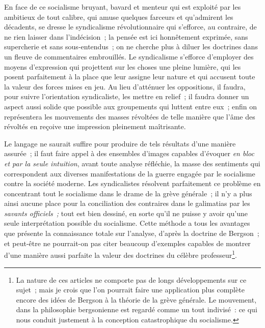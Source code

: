\documentclass[french,twoside]{book} %
\begin{document}
\noindent En face de ce socialisme bruyant, bavard et menteur qui est exploité par les ambitieux de tout calibre, qui amuse quelques farceurs et qu’admirent les décadents, se dresse le syndicalisme révolutionnaire qui s’efforce, au contraire, de ne rien laisser dans l’indécision ; la pensée est ici honnêtement exprimée, sans supercherie et sans sous-entendus ; on ne cherche plus à diluer les doctrines dans un fleuve de commentaires embrouillés. Le syndicalisme s’efforce d’employer des moyens d’expression qui projettent sur les choses une pleine lumière, qui les posent parfaitement à la place que leur assigne leur nature et qui accusent toute la valeur des forces mises en jeu. Au lieu d’atténuer les oppositions, il faudra, pour suivre l’orientation syndicaliste, les mettre en relief ; il faudra donner un aspect aussi solide que possible aux groupements qui luttent entre eux ; enfin on représentera les mouvements des masses révoltées de telle  manière que l’âme des révoltés en reçoive une impression pleinement maîtrisante.\par
Le langage ne saurait suffire pour produire de tels résultats d’une manière assurée ; il faut faire appel à des ensembles d’images capables d’évoquer \emph{en bloc et par la seule intuition}, avant toute analyse réfléchie, la masse des sentiments qui correspondent aux diverses manifestations de la guerre engagée par le socialisme contre la société moderne. Les syndicalistes résolvent parfaitement ce problème en concentrant tout le socialisme dans le drame de la grève générale ; il n’y a plus ainsi aucune place pour la conciliation des contraires dans le galimatias par les \emph{savants officiels ;} tout est bien dessiné, en sorte qu’il ne puisse y avoir qu’une seule interprétation possible du socialisme. Cette méthode a tous les avantages que présente la connaissance totale sur l’analyse, d’après la doctrine de Bergson ; et peut-être ne pourrait-on pas citer beaucoup d’exemples capables de montrer d’une manière aussi parfaite la valeur des doctrines du célèbre professeur\footnote{ \noindent La nature de ces articles ne comporte pas de longs développements sur ce sujet ; mais je crois que l’on pourrait faire une application plus complète encore des idées de Bergson à la théorie de la grève générale. Le mouvement, dans la philosophie bergsonienne est regardé comme un tout indivisé : ce qui nous conduit justement à la conception catastrophique du socialisme.
 }.\par
\end{document}
